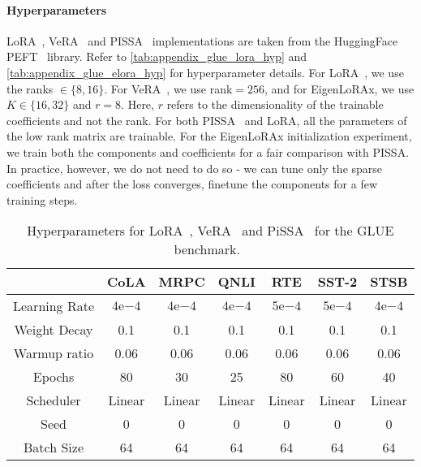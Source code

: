 \paragraph{Hyperparameters} LoRA~\citep{hu2021lora}, VeRA~\citep{kopiczko_vera_2023} and PISSA~\citep{meng_pissa_2024} implementations are taken from the HuggingFace PEFT~\citep{peft} library. Refer to \autoref{tab:appendix_glue_lora_hyp} and \autoref{tab:appendix_glue_elora_hyp} for hyperparameter details. For LoRA~\citep{hu2021lora}, we use the ranks $\in \{8,16\}$. For VeRA~\citep{kopiczko_vera_2023}, we use rank$=256$, and for EigenLoRAx, we use $K\in\{16, 32\}$ and $r=8$. Here, $r$ refers to the dimensionality of the trainable coefficients and not the rank. For both PISSA~\citep{meng_pissa_2024} and LoRA, all the parameters of the low rank matrix are trainable. For the EigenLoRAx initialization experiment, we train both the components and coefficients for a fair comparison with PISSA. In practice, however, we do not need to do so - we can tune only the sparse coefficients and after the loss converges, finetune the components for a few training steps.



\begin{table}[h]
  \centering
   \caption{Hyperparameters for LoRA~\citep{hu2021lora}, VeRA~\citep{kopiczko_vera_2023} and PiSSA~\citep{meng_pissa_2024} for the GLUE benchmark.~\citep{glue}}
  \begin{tabular}{ccccccc}
    \toprule
    & CoLA & MRPC & QNLI & RTE & SST-2 & STSB \\
    \midrule
    Learning Rate            & $4\mathrm{e}{-4}$
 & $4\mathrm{e}{-4}$ & $4\mathrm{e}{-4}$ & $5\mathrm{e}{-4}$ & $5\mathrm{e}{-4}$ & $4\mathrm{e}{-4}$ \\ 
    Weight Decay            & 0.1      & 0.1      & 0.1      & 0.1      & 0.1      & 0.1      \\ 
    Warmup ratio  & 0.06     & 0.06     & 0.06     & 0.06     & 0.06     & 0.06     \\ 
    Epochs        & 80       & 30       & 25       & 80       & 60       & 40       \\ 
    Scheduler     & Linear   & Linear   & Linear   & Linear   & Linear   & Linear   \\
    Seed          & 0        & 0        & 0        & 0        & 0        & 0        \\ 
    Batch Size          & 64       & 64        & 64        & 64        & 64        & 64\\ 
    \bottomrule
  \end{tabular}
  \label{tab:appendix_glue_lora_hyp}
\end{table}


